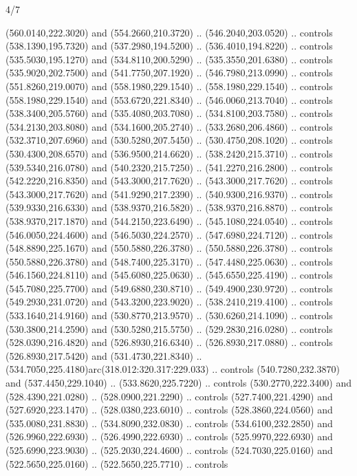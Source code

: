 \begin{flagdescription}{4/7}
\begin{scope}[shift={(0.5\flaglength,0.5\flagwidth)},scale=\flagwidth*\stretchfactor/820]
\begin{scope}[scale=1.87,xshift=-138mm,yshift=75mm]
\begin{scope}[y=0.8pt, x=0.8pt, yscale=-1, xscale=1]
\begin{scope}[fill=cd2a567]
  (560.0140,222.3020) and (554.2660,210.3720) .. (546.2040,203.0520) .. controls
  (538.1390,195.7320) and (537.2980,194.5200) .. (536.4010,194.8220) .. controls
  (535.5030,195.1270) and (534.8110,200.5290) .. (535.3550,201.6380) .. controls
  (535.9020,202.7500) and (541.7750,207.1920) .. (546.7980,213.0990) .. controls
  (551.8260,219.0070) and (558.1980,229.1540) .. (558.1980,229.1540) .. controls
  (558.1980,229.1540) and (553.6720,221.8340) .. (546.0060,213.7040) .. controls
  (538.3400,205.5760) and (535.4080,203.7080) .. (534.8100,203.7580) .. controls
  (534.2130,203.8080) and (534.1600,205.2740) .. (533.2680,206.4860) .. controls
  (532.3710,207.6960) and (530.5280,207.5450) .. (530.4750,208.1020) .. controls
  (530.4300,208.6570) and (536.9500,214.6620) .. (538.2420,215.3710) .. controls
  (539.5340,216.0780) and (540.2320,215.7250) .. (541.2270,216.2800) .. controls
  (542.2220,216.8350) and (543.3000,217.7620) .. (543.3000,217.7620) .. controls
  (543.3000,217.7620) and (541.9290,217.2390) .. (540.9300,216.9370) .. controls
  (539.9330,216.6330) and (538.9370,216.5820) .. (538.9370,216.8870) .. controls
  (538.9370,217.1870) and (544.2150,223.6490) .. (545.1080,224.0540) .. controls
  (546.0050,224.4600) and (546.5030,224.2570) .. (547.6980,224.7120) .. controls
  (548.8890,225.1670) and (550.5880,226.3780) .. (550.5880,226.3780) .. controls
  (550.5880,226.3780) and (548.7400,225.3170) .. (547.4480,225.0630) .. controls
  (546.1560,224.8110) and (545.6080,225.0630) .. (545.6550,225.4190) .. controls
  (545.7080,225.7700) and (549.6880,230.8710) .. (549.4900,230.9720) .. controls
  (549.2930,231.0720) and (543.3200,223.9020) .. (538.2410,219.4100) .. controls
  (533.1640,214.9160) and (530.8770,213.9570) .. (530.6260,214.1090) .. controls
  (530.3800,214.2590) and (530.5280,215.5750) .. (529.2830,216.0280) .. controls
  (528.0390,216.4820) and (526.8930,216.6340) .. (526.8930,217.0880) .. controls
  (526.8930,217.5420) and (531.4730,221.8340) ..
  (534.7050,225.4180)arc(318.012:320.317:229.033) .. controls
  (540.7280,232.3870) and (537.4450,229.1040) .. (533.8620,225.7220) .. controls
  (530.2770,222.3400) and (528.4390,221.0280) .. (528.0900,221.2290) .. controls
  (527.7400,221.4290) and (527.6920,223.1470) .. (528.0380,223.6010) .. controls
  (528.3860,224.0560) and (535.0080,231.8830) .. (534.8090,232.0830) .. controls
  (534.6100,232.2850) and (526.9960,222.6930) .. (526.4990,222.6930) .. controls
  (525.9970,222.6930) and (525.6990,223.9030) .. (525.2030,224.4600) .. controls
  (524.7030,225.0160) and (522.5650,225.0160) .. (522.5650,225.7710) .. controls

\end{scope}
\end{scope}
\end{scope}
\end{scope}
\end{flagdescription}
